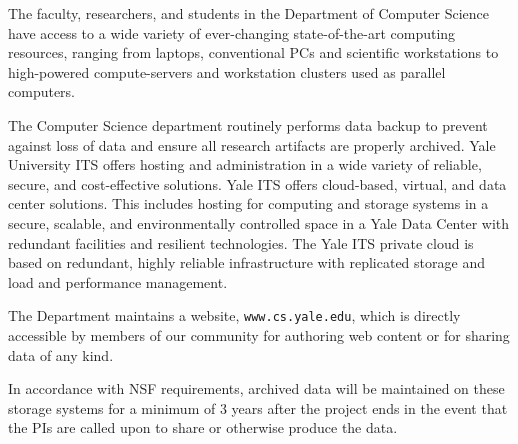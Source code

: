 \documentclass[11pt]{article}
\begin{document}
The faculty, researchers, and students in the Department of Computer
Science have access to a wide variety of ever-changing
state-of-the-art computing resources, ranging from laptops,
conventional PCs and scientific workstations to high-powered
compute-servers and workstation clusters used as parallel computers.

The Computer Science department routinely performs data backup to
prevent against loss of data and ensure all research artifacts are
properly archived. Yale University ITS offers hosting and
administration in a wide variety of reliable, secure, and
cost-effective solutions. Yale ITS offers cloud-based, virtual, and
data center solutions.  This includes hosting for computing and
storage systems in a secure, scalable, and environmentally controlled
space in a Yale Data Center with redundant facilities and resilient
technologies. The Yale ITS private cloud is based on redundant, highly
reliable infrastructure with replicated storage and load and
performance management.

The Department maintains a website, \texttt{www.cs.yale.edu}, which is
directly accessible by members of our community for authoring web
content or for sharing data of any kind.

In accordance with NSF requirements, archived data will be maintained
on these storage systems for a minimum of 3 years after the project
ends in the event that the PIs are called upon to share or otherwise
produce the data. 
\end{document}
